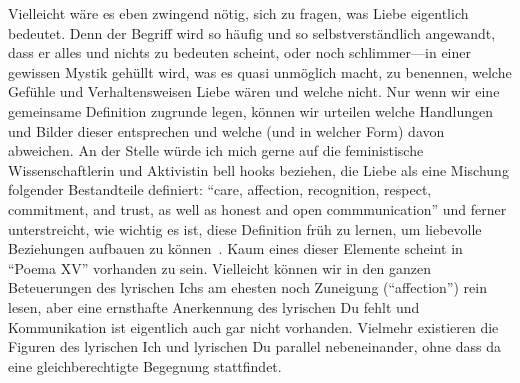 Vielleicht wäre es eben zwingend nötig, sich zu fragen, was Liebe eigentlich bedeutet.
Denn der Begriff wird so häufig und so selbstverständlich angewandt, dass er alles und nichts zu bedeuten scheint, oder noch schlimmer—in einer gewissen Mystik gehüllt wird, was es quasi unmöglich macht, zu benennen, welche Gefühle und Verhaltensweisen Liebe wären und welche nicht.
Nur wenn wir eine gemeinsame Definition zugrunde legen, können wir urteilen welche Handlungen und Bilder dieser entsprechen und welche (und in welcher Form) davon abweichen.
An der Stelle würde ich mich gerne auf die feministische Wissenschaftlerin und Aktivistin bell hooks beziehen, die Liebe als eine Mischung folgender Bestandteile definiert: ``care, affection, recognition, respect, commitment, and trust, as well as honest and open commmunication''
und ferner unterstreicht, wie wichtig es ist, diese Definition früh zu lernen, um liebevolle Beziehungen aufbauen zu können~\cite{hooks2001}.
Kaum eines dieser Elemente scheint in ``Poema XV'' vorhanden zu sein.
Vielleicht können wir in den ganzen Beteuerungen des lyrischen Ichs am ehesten noch Zuneigung (``affection'') rein lesen, aber eine ernsthafte Anerkennung des lyrischen Du fehlt und Kommunikation ist eigentlich auch gar nicht vorhanden.
Vielmehr existieren die Figuren des lyrischen Ich und lyrischen Du parallel nebeneinander, ohne dass da eine gleichberechtigte Begegnung stattfindet.

